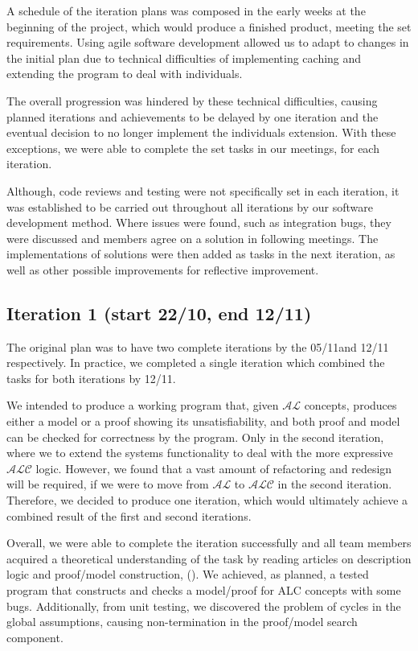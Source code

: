A schedule of the iteration plans was composed in the early weeks at the beginning of the project, which would produce a finished product, meeting the set requirements. Using agile software development allowed us to adapt to changes in the initial plan due to technical difficulties of implementing caching and extending the program to deal with individuals.

The overall progression was hindered by these technical difficulties, causing planned iterations and achievements to be delayed by one iteration and the eventual decision to no longer implement the individuals extension. With these exceptions, we were able to complete the set tasks in our meetings, for each iteration.

Although, code reviews and testing were not specifically set in each iteration, it was established to be carried out throughout all iterations by our software development method. Where issues were found, such as integration bugs, they were discussed and members agree on a solution in following meetings. The implementations of solutions were then added as tasks in the next iteration, as well as other possible improvements for reflective improvement.

\subsection*{Iteration 1 (start 22/10, end 12/11)}

The original plan was to have two complete iterations by the 05/11and 12/11 respectively. In practice, we completed a single iteration which combined the tasks for both iterations by 12/11.

We intended to produce a working program that, given $\mathcal{AL}$ concepts, produces either a model or a proof showing its unsatisfiability, and both proof and model can be checked for correctness by the program. Only in the second iteration, where we to extend the systems functionality to deal with the more expressive  $\mathcal{ALC}$ logic. However, we found that a vast amount of refactoring and redesign will be required, if we were to move from  $\mathcal{AL}$ to  $\mathcal{ALC}$ in the second iteration. Therefore, we decided to produce one iteration, which would ultimately achieve a combined result of the first and second iterations.

Overall, we were able to complete the iteration successfully and all team members acquired a theoretical understanding of the task by reading articles on description logic and proof/model construction, (\cite{baadernutt02, gore99, Gore:2010:OTA, gore07}). We achieved, as planned, a tested program that constructs and checks a model/proof for ALC concepts with some bugs. Additionally, from unit testing, we discovered the problem of cycles in the global assumptions, causing non-termination in the proof/model search component.

